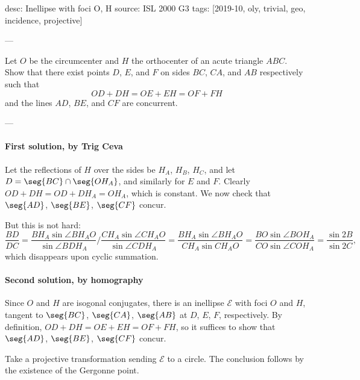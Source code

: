 desc: Inellipse with foci O, H
source: ISL 2000 G3
tags: [2019-10, oly, trivial, geo, incidence, projective]

---

Let $O$ be the circumcenter and $H$ the orthocenter of an acute triangle $ABC$. Show that there exist points $D$, $E$, and $F$ on sides $BC$, $CA$, and $AB$ respectively such that\[OD+DH=OE+EH=OF+FH\]
and the lines $AD$, $BE$, and $CF$ are concurrent.

---

\paragraph{First solution, by Trig Ceva}     Let the reflections of $H$ over the sides be $H_A$, $H_B$, $H_C$, and let $D=\seg{BC}\cap\seg{OH_A}$, and similarly for $E$ and $F$. Clearly $OD+DH=OD+DH_A=OH_A$, which is constant. We now check that $\seg{AD}$, $\seg{BE}$, $\seg{CF}$ concur.

But this is not hard: \[\frac{BD}{DC}=\frac{BH_A\sin\angle BH_AO}{\sin\angle BDH_A}\bigg/\frac{CH_A\sin\angle CH_AO}{\sin\angle CDH_A}=\frac{BH_A\sin\angle BH_AO}{CH_A\sin CH_AO}=\frac{BO\sin\angle BOH_A}{CO\sin\angle COH_A}=\frac{\sin 2B}{\sin 2C},\]
which disappears upon cyclic summation.

\paragraph{Second solution, by homography}     Since $O$ and $H$ are isogonal conjugates, there is an inellipse $\mathcal E$ with foci $O$ and $H$, tangent to $\seg{BC}$, $\seg{CA}$, $\seg{AB}$ at $D$, $E$, $F$, respectively. By definition, $OD+DH=OE+EH=OF+FH$, so it suffices to show that $\seg{AD}$, $\seg{BE}$, $\seg{CF}$ concur.

Take a projective transformation sending $\mathcal E$ to a circle. The conclusion follows by the existence of the Gergonne point.

